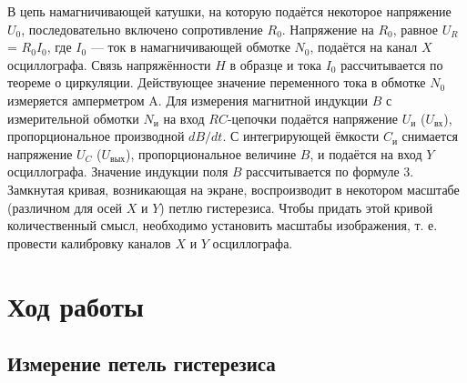 \documentclass[a4paper,12pt]{article} %
\begin{document}
В цепь намагничивающей катушки, на которую подаётся некоторое напряжение $U_0$,
последовательно включено сопротивление $R_0$. Напряжение на $R_0$, равное $U_R$=
$R_0I_0$, где $I_0$ — ток в намагничивающей обмотке $N_0$, подаётся на канал $ X
$ осциллографа. Связь напряжённости $ H $ в образце и тока $I_0$ рассчитывается
по теореме о циркуляции.  Действующее значение переменного тока в обмотке $N_0$
измеряется амперметром A.  Для измерения магнитной индукции $ B $ с
измерительной обмотки $N_\text{и}$ на вход $ RC $-цепочки подаётся напряжение
$U_\text{и}$ ($U_{\text{вх}}$), пропорциональное производной $ dB/dt $. С
интегрирующей ёмкости $C_\text{и}$ снимается напряжение $U_C$
($U_{\text{вых}}$), пропорциональное величине $ B $, и подаётся на вход $ Y $
осциллографа. Значение индукции поля $ B $ рассчитывается по формуле 3.
Замкнутая кривая, возникающая на экране, воспроизводит в некотором масштабе
(различном для осей $ X $ и $ Y $) петлю гистерезиса. Чтобы придать этой кривой
количественный смысл, необходимо установить масштабы изображения, т. е. провести
калибровку каналов $X$ и $Y$ осциллографа.

\section{Ход работы}
\subsection{Измерение петель гистерезиса}
\end{document}
